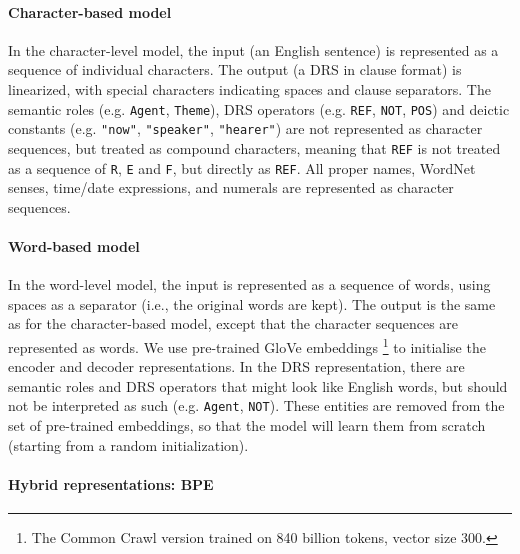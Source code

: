 \documentclass[11pt,a4paper]{article}
\begin{document}
\paragraph{Character-based model}

In the character-level model, the input (an English sentence) is represented as a sequence of individual characters. The output (a DRS in clause format) is linearized, with special characters indicating spaces and clause separators. The semantic roles  (e.g. \texttt{Agent}, \texttt{Theme}), DRS operators (e.g. \texttt{REF}, \texttt{NOT}, \texttt{POS}) and deictic constants (e.g. \texttt{"now"}, \texttt{"speaker"}, \texttt{"hearer"}) are not represented as character sequences, but treated as compound characters, meaning that \texttt{REF} is not treated as a sequence of \texttt{R}, \texttt{E} and \texttt{F}, but directly as \texttt{REF}.
All proper names, WordNet senses, time/date expressions, and numerals are represented as character sequences.

\paragraph{Word-based model}

In the word-level model, the input is represented as a sequence of words, using spaces as a separator (i.e., the original words are kept). The output is the same as for the character-based model, except that the character sequences are represented as words.
We use pre-trained GloVe embeddings \cite{glove:14}\footnote{The Common Crawl version trained on 840 billion tokens, vector size 300.} 
to initialise the encoder and decoder representations. In the DRS representation, there are semantic roles and DRS operators that might look like English words, but should not be interpreted as such (e.g. \texttt{Agent}, \texttt{NOT}). These entities are removed from the set of pre-trained embeddings, so that the model will learn them from scratch (starting from a random initialization). 

\paragraph{Hybrid representations: BPE}
\end{document}
